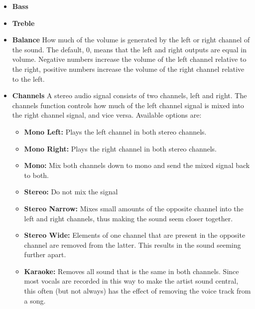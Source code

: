 \begin{itemize}
\item \textbf{Bass}
\item \textbf{Treble}
\item \textbf{Balance}
  How much of the volume is generated by the left or right channel of the sound.  The default, 0, means that the left and right outputs are equal in volume.  Negative numbers increase the volume of the left channel relative to the right, positive numbers increase the volume of the right channel relative to the left.
\item \textbf{Channels}
  A stereo audio signal consists of two channels, left and right.  The channels function controls how much of the left channel signal is mixed into the right channel signal, and vice versa.
      Available options are:

    \begin{itemize}
    \item \textbf{Mono Left: }Plays the left channel in both stereo channels.
    \item \textbf{Mono Right:} Plays the right channel in both stereo channels.
    \item \textbf{Mono:} Mix both channels down to mono and send the mixed signal
      back to both.
    \item \textbf{Stereo:} Do not mix the signal
    \item \textbf{Stereo Narrow: }Mixes small amounts of the opposite channel into
      the left and right channels, thus making the sound seem closer
      together.
    \item \textbf{Stereo Wide:} Elements of one channel that are present in the
      opposite channel are removed from the latter.  This results in the
      sound seeming further apart.
    \item \textbf{Karaoke:} Removes all sound that is the same in both channels. 
      Since most vocals are recorded in this way to make the artist sound
      central, this often (but not always) has the effect of removing the
      voice track from a song.
    \end{itemize}
  

\end{itemize}
